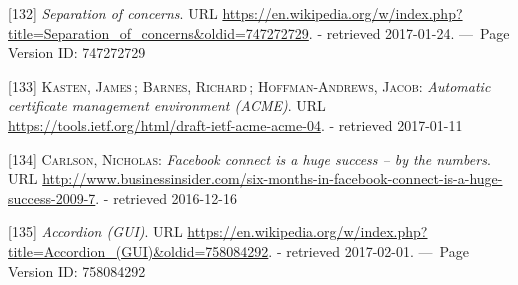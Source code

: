 \documentclass[12pt,english,a4paper,titlepage,cleardoublepage=empty,dottedtoc]{report}
\begin{document}
\hypertarget{ref-web_2016_wikipedia_separation-of-concerns}{}
{[}132{]} \emph{Separation of concerns}. URL
\url{https://en.wikipedia.org/w/index.php?title=Separation_of_concerns\&oldid=747272729}.
- retrieved 2017-01-24. ---~Page Version ID: 747272729

\hypertarget{ref-web_spec_acme}{}
{[}133{]} \textsc{Kasten, James}\,; \textsc{Barnes, Richard}\,;
\textsc{Hoffman-Andrews, Jacob}: \emph{Automatic certificate management
environment (ACME)}. URL
\url{https://tools.ietf.org/html/draft-ietf-acme-acme-04}. - retrieved
2017-01-11

\hypertarget{ref-web_2009-success-of-facebook-connect}{}
{[}134{]} \textsc{Carlson, Nicholas}: \emph{Facebook connect is a huge
success -- by the numbers}. URL
\url{http://www.businessinsider.com/six-months-in-facebook-connect-is-a-huge-success-2009-7}.
- retrieved 2016-12-16

\hypertarget{ref-web_2016_wikipedia_accordion-gui}{}
{[}135{]} \emph{Accordion (GUI)}. URL
\url{https://en.wikipedia.org/w/index.php?title=Accordion_(GUI)\&oldid=758084292}.
- retrieved 2017-02-01. ---~Page Version ID: 758084292
\end{document}
